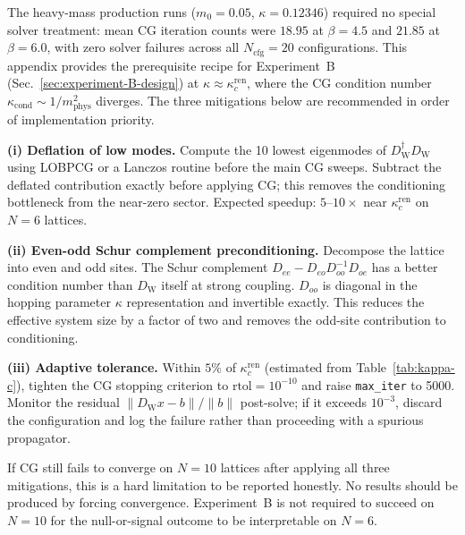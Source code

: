 \documentclass[12pt]{article}
\theoremstyle{definition}
\theoremstyle{remark}
\newcommand{\dW}{D_{\mathrm{W}}}        %
\newcommand{\kcren}{\kappa_{c}^{\mathrm{ren}}}      %
\newcommand{\Ncfg}{N_{\mathrm{cfg}}}                  %
\begin{document}
	The heavy-mass production runs ($m_0=0.05$, $\kappa=0.12346$) required no
	special solver treatment: mean CG iteration counts were $18.95$ at
	$\beta=4.5$ and $21.85$ at $\beta=6.0$, with zero solver failures across
	all $\Ncfg=20$ configurations.  This appendix provides the prerequisite
	recipe for Experiment~B (Sec.~\ref{sec:experiment-B-design}) at
	$\kappa\approx\kcren$, where the CG condition number
	$\kappa_{\mathrm{cond}}\sim 1/m_{\mathrm{phys}}^2$ diverges.  The three
	mitigations below are recommended in order of implementation priority.
	
	\medskip
	\noindent\textbf{(i) Deflation of low modes.}\enspace
	Compute the 10 lowest eigenmodes of $\dW^\dagger\dW$ using LOBPCG or a
	Lanczos routine before the main CG sweeps.  Subtract the deflated
	contribution exactly before applying CG; this removes the conditioning
	bottleneck from the near-zero sector.  Expected speedup: $5$--$10\times$
	near $\kcren$ on $N=6$ lattices.
	
	\medskip
	\noindent\textbf{(ii) Even-odd Schur complement preconditioning.}\enspace
	Decompose the lattice into even and odd sites.  The Schur complement
	$D_{ee} - D_{eo}D_{oo}^{-1}D_{oe}$ has a better condition number than
	$\dW$ itself at strong coupling.  $D_{oo}$ is diagonal in the hopping
	parameter $\kappa$ representation and invertible exactly.  This reduces the
	effective system size by a factor of two and removes the odd-site
	contribution to conditioning.
	
	\medskip
	\noindent\textbf{(iii) Adaptive tolerance.}\enspace
	Within $5\%$ of $\kcren$ (estimated from Table~\ref{tab:kappa-c}), tighten
	the CG stopping criterion to $\mathrm{rtol}=10^{-10}$ and raise
	\texttt{max\_iter} to 5000.  Monitor the residual
	$\|\dW x - b\|/\|b\|$ post-solve; if it exceeds $10^{-3}$, discard the
	configuration and log the failure rather than proceeding with a spurious
	propagator.
	
	\medskip
	If CG still fails to converge on $N=10$ lattices after applying all three
	mitigations, this is a hard limitation to be reported honestly.  No results
	should be produced by forcing convergence.  Experiment~B is not required to
	succeed on $N=10$ for the null-or-signal outcome to be interpretable on
	$N=6$.
	
	
\end{document}
